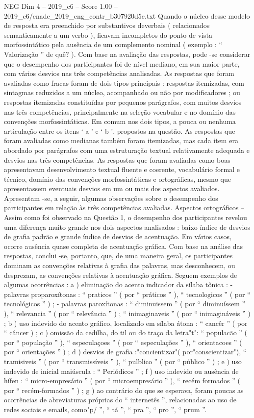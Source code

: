 \begin{textsample}{NEG Dim 4 – 2019\_c6 – Score 1.00 – 2019\_c6/enade\_2019\_eng\_contr\_b307920d5e.txt}
Quando o núcleo desse modelo de resposta era preenchido por substantivos deverbais ( relacionados semanticamente a um verbo ), ficavam incompletos do ponto de vista morfossintático pela ausência de um complemento nominal ( exemplo : “ Valorização ” de quê? ).
Com base na avaliação das respostas, pode -se considerar que o desempenho dos participantes foi de nível mediano, em sua maior parte, com vários desvios nas três competências analisadas.
As respostas que foram avaliadas como fracas foram de dois tipos principais : respostas itemizadas, com sintagmas reduzidos a um núcleo, acompanhado ou não por modificadores ; ou respostas itemizadas constituídas por pequenos parágrafos, com muitos desvios nas três competências, principalmente na seleção vocabular e no domínio das convenções morfossintáticas.
Em comum nos dois tipos, a pouca ou nenhuma articulação entre os itens ‘ a ’ e ‘ b ’, propostos na questão.
As respostas que foram avaliadas como medianas também foram itemizadas, mas cada item era abordado por parágrafos com uma estruturação textual relativamente adequada e desvios nas três competências.
As respostas que foram avaliadas como boas apresentavam desenvolvimento textual fluente e coerente, vocabulário formal e técnico, domínio das convenções morfossintáticas e ortográficas, mesmo que apresentassem eventuais desvios em um ou mais dos aspectos avaliados.
Apresentam -se, a seguir, algumas observações sobre o desempenho dos participantes em relação às três competências avaliadas.
Aspectos ortográficos – Assim como foi observado na Questão 1, o desempenho dos participantes revelou uma diferença muito grande nos dois aspectos analisados : baixo índice de desvios de grafia padrão e grande índice de desvios de acentuação.
Em vários casos, ocorre ausência quase completa de acentuação gráfica.
Com base na análise das respostas, conclui -se, portanto, que, de uma maneira geral, os participantes dominam as convenções relativas à grafia das palavras, mas desconhecem, ou desprezam, as convenções relativas à acentuação gráfica.
Seguem exemplos de algumas ocorrências : a ) eliminação do acento indicador da sílaba tônica : - palavras proparoxítonas : “ praticos ” ( por “ práticos ” ), “ tecnologicos ” ( por “ tecnológicos ” ) ; - palavras paroxítonas : “ diminuissem ” ( por “ diminuíssem ” ), “ relevancia ” ( por “ relevância ” ) ; “ inimaginaveis ” ( por “ inimagináveis ” ) ; b ) uso indevido do acento gráfico, localizado em sílaba átona : “ cancêr ” ( por “ câncer ) ; c ) omissão da cedilha, do til ou do traço da letra"t": “ populacão ” ( por “ população ” ), “ especulaçoes ” ( por “ especulações ” ), “ orientacoes ” ( por “ orientações ” ) ; d ) desvios de grafia :"concientizar"( por"conscientizar"), “ tramisiveis ” ( por “ transmissíveis ” ), “ pulblico ” ( por “ público ” ) ; e ) uso indevido de inicial maiúscula : “ Periódicos ” ; f ) uso indevido ou ausência de hífen : “ micro-empresário ” ( por “ microempresário ” ), “ recém formados ” ( por “ recém-formados ” ) ; g ) ao contrário do que se esperava, foram poucas as ocorrências de abreviaturas próprias do “ internetês ”, relacionadas ao uso de redes sociais e emails, como"p/ ”, “ tá ”, “ pra ”, “ pro ”, “ prum ”.

\end{textsample}
